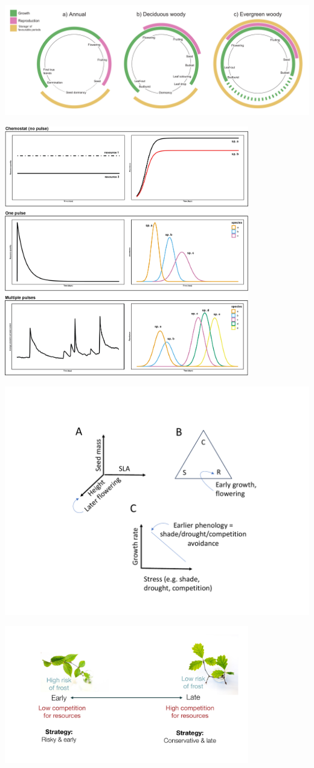 \documentclass[11pt]{article}
\begin{document}
\includegraphics[width=1\textwidth]{..//figures/figsubmit/phenologycircles_2023.1.13.pdf}

\clearpage
\includegraphics[width=0.8\textwidth]{..//figures/figsubmit/sixpanel_concept_increasespp.png}


\clearpage
\includegraphics[width=1\textwidth]{..//figures/figsubmit/AREESfigure.pdf}


\clearpage
\includegraphics[width=0.8\textwidth]{..//figures/figsubmit/wolkovich_CEFE2023wide_slide.pdf}
\end{document}
